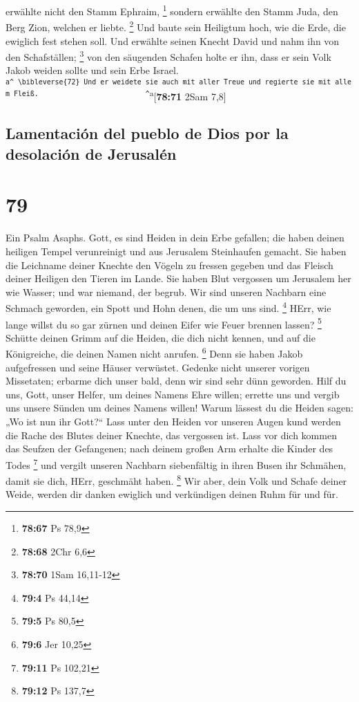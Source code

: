 erwählte nicht den Stamm Ephraim, \footnote{\textbf{78:67} Ps 78,9}
 sondern erwählte den Stamm Juda, den Berg Zion, welchen
er liebte. \footnote{\textbf{78:68} 2Chr 6,6}  Und baute
sein Heiligtum hoch, wie die Erde, die ewiglich fest stehen soll.
 Und erwählte seinen Knecht David und nahm ihn von den
Schafställen; \footnote{\textbf{78:70} 1Sam 16,11-12} 
von den säugenden Schafen holte er ihn, dass er sein Volk Jakob weiden
sollte und sein Erbe Israel.
\textsuperscript{\texttt{a\^{}\ \textbackslash{}bibleverse\{72\}\ Und\ er\ weidete\ sie\ auch\ mit\ aller\ Treue\ und\ regierte\ sie\ mit\ allem\ Fleiß.\ \ \ \ \ \ \ \ \ \ \ \ \ \ \ \ \ \ \ \ \ \ \ \ \ \ \^{}}a}{[}\textbf{78:71}
2Sam 7,8{]}

\hypertarget{lamentaciuxf3n-del-pueblo-de-dios-por-la-desolaciuxf3n-de-jerusaluxe9n}{%
\subsection{Lamentación del pueblo de Dios por la desolación de
Jerusalén}\label{lamentaciuxf3n-del-pueblo-de-dios-por-la-desolaciuxf3n-de-jerusaluxe9n}}

\hypertarget{section-78}{%
\section{79}\label{section-78}}

 Ein Psalm Asaphs. Gott, es sind Heiden in dein Erbe
gefallen; die haben deinen heiligen Tempel verunreinigt und aus
Jerusalem Steinhaufen gemacht.  Sie haben die Leichname
deiner Knechte den Vögeln zu fressen gegeben und das Fleisch deiner
Heiligen den Tieren im Lande.  Sie haben Blut vergossen um
Jerusalem her wie Wasser; und war niemand, der begrub. 
Wir sind unseren Nachbarn eine Schmach geworden, ein Spott und Hohn
denen, die um uns sind. \footnote{\textbf{79:4} Ps 44,14} 
HErr, wie lange willst du so gar zürnen und deinen Eifer wie Feuer
brennen lassen? \footnote{\textbf{79:5} Ps 80,5}  Schütte
deinen Grimm auf die Heiden, die dich nicht kennen, und auf die
Königreiche, die deinen Namen nicht anrufen. \footnote{\textbf{79:6} Jer
  10,25}  Denn sie haben Jakob aufgefressen und seine
Häuser verwüstet.  Gedenke nicht unserer vorigen
Missetaten; erbarme dich unser bald, denn wir sind sehr dünn geworden.
 Hilf du uns, Gott, unser Helfer, um deines Namens Ehre
willen; errette uns und vergib uns unsere Sünden um deines Namens
willen!  Warum lässest du die Heiden sagen: „Wo ist nun
ihr Gott?{}`` Lass unter den Heiden vor unseren Augen kund werden die
Rache des Blutes deiner Knechte, das vergossen ist.  Lass
vor dich kommen das Seufzen der Gefangenen; nach deinem großen Arm
erhalte die Kinder des Todes \footnote{\textbf{79:11} Ps 102,21}
 und vergilt unseren Nachbarn siebenfältig in ihren Busen
ihr Schmähen, damit sie dich, HErr, geschmäht haben. \footnote{\textbf{79:12}
  Ps 137,7}  Wir aber, dein Volk und Schafe deiner Weide,
werden dir danken ewiglich und verkündigen deinen Ruhm für und für.

